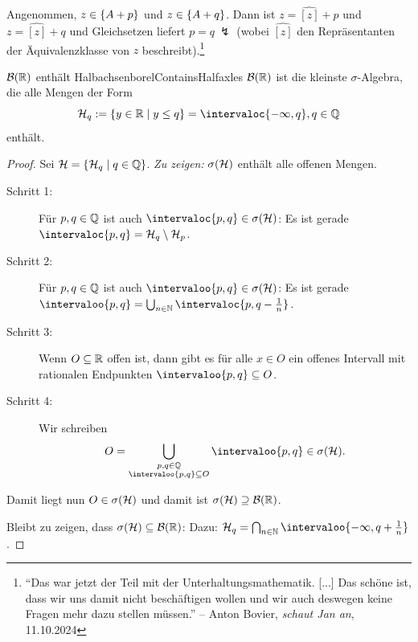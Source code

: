 \documentclass[language=ngerman]{../../Template/TemplateLecture}
\begin{document}
Angenommen, $z \in \{A + p\}$ und $z \in \{A + q\}$. Dann ist $z = \widehat{[z]} + p$ und $z = \widehat{[z]} + q$ und Gleichsetzen liefert $p = q ~\lightning$ (wobei $\widehat{[z]}$ den Repräsentanten der Äquivalenzklasse von $z$ beschreibt).\footnote{\enquote{Das war jetzt der Teil mit der Unterhaltungsmathematik. [...] Das schöne ist, dass wir uns damit nicht beschäftigen wollen und wir auch deswegen keine Fragen mehr dazu stellen müssen.} -- Anton Bovier, \emph{schaut Jan an}, 11.10.2024}

\begin{lem}{$\mathcal{B}(\mathbb{R})$ enthält Halbachsen}{borelContainsHalfaxles}
    $\mathcal{B}(\mathbb{R})$ ist die kleinste $\sigma$-Algebra, die alle Mengen der Form 
    \begin{equation}
        \cH_q := \set{y \in \IR \mid y \leq q} = \intervaloc{-\infty,q}, q \in \IQ
    \end{equation}
    enthält.
\end{lem}

\begin{proof}
    Sei $\mathcal{H} = \{\mathcal{H}_q \mid q \in \mathbb{Q}\}$. \emph{Zu zeigen:} $\sigma(\mathcal{H})$ enthält alle offenen Mengen.

    \begin{description}
        \item[Schritt 1:] Für $p,q \in \mathbb{Q}$ ist auch $\intervaloc{p,q} \in \sigma(\cH)$: Es ist gerade $\intervaloc{p,q} = \cH_q \setminus \cH_p$.
        \item[Schritt 2:] Für $p,q \in \mathbb{Q}$ ist auch $\intervaloo{p,q} \in \sigma(\cH)$: Es ist gerade $\intervaloo{p,q} = \bigcup_{n \in \IN} \intervaloc{p, q - \frac{1}{n}}$.
        \item[Schritt 3:] Wenn $O \subseteq \mathbb{R}$ offen ist, dann gibt es für alle $x \in O$ ein offenes Intervall mit rationalen Endpunkten $\intervaloo{p,q} \subseteq O$. 
        \item[Schritt 4:] Wir schreiben 
        \begin{equation}
            O = \bigcup_{\substack{p,q \in \IQ \\ \intervaloo{p,q} \subseteq O}} \intervaloo{p,q} \in \sigma(\cH).
        \end{equation} 
    \end{description}
    Damit liegt nun $O \in \sigma(\mathcal{H})$ und damit ist $\sigma(\mathcal{H}) \supseteq \mathcal{B}(\mathbb{R})$.

    Bleibt zu zeigen, dass $\sigma(\mathcal{H}) \subseteq \mathcal{B}(\mathbb{R})$: Dazu: $\cH_q = \bigcap_{n \in \IN} \intervaloo{-\infty, q + \frac{1}{n}}$.
\end{proof}
\end{document}
